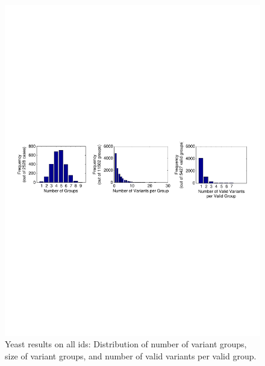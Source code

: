 \begin{figure}[htbp]
\centering %
\includegraphics[trim = 2mm 105mm 4mm 105mm,
clip,width=\textwidth]{fig/phospho/allIds/size_dist_all_by_STY.pdf}
\caption{Yeast results on all ids: Distribution of number of variant groups, size of variant groups, and number of valid variants per valid group.}
\label{fig:yeast_sizedist_STY}
\end{figure}


